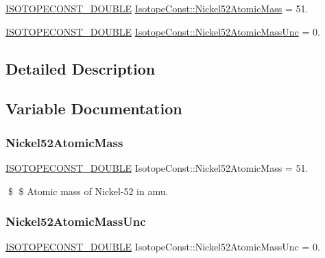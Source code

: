 \begin{DoxyCompactItemize}
\item 
\mbox{\hyperlink{group___isotope_const-_macros_ga8f45a7272ce02c0b4c65c44636ed719a}{I\+S\+O\+T\+O\+P\+E\+C\+O\+N\+S\+T\+\_\+\+D\+O\+U\+B\+LE}} \mbox{\hyperlink{group___isotope_const-_nickel-_ni52_ga25692217d321bda15555c4bd782d0579}{Isotope\+Const\+::\+Nickel52\+Atomic\+Mass}} = 51.
\item 
\mbox{\hyperlink{group___isotope_const-_macros_ga8f45a7272ce02c0b4c65c44636ed719a}{I\+S\+O\+T\+O\+P\+E\+C\+O\+N\+S\+T\+\_\+\+D\+O\+U\+B\+LE}} \mbox{\hyperlink{group___isotope_const-_nickel-_ni52_ga3ffdc1ebd3eae89ee06c9985dcb5be0f}{Isotope\+Const\+::\+Nickel52\+Atomic\+Mass\+Unc}} = 0.
\end{DoxyCompactItemize}


\subsection{Detailed Description}


\subsection{Variable Documentation}
\mbox{\label{group___isotope_const-_nickel-_ni52_ga25692217d321bda15555c4bd782d0579}} 
\subsubsection{\texorpdfstring{Nickel52\+Atomic\+Mass}{Nickel52AtomicMass}}
{\footnotesize\ttfamily \mbox{\hyperlink{group___isotope_const-_macros_ga8f45a7272ce02c0b4c65c44636ed719a}{I\+S\+O\+T\+O\+P\+E\+C\+O\+N\+S\+T\+\_\+\+D\+O\+U\+B\+LE}} Isotope\+Const\+::\+Nickel52\+Atomic\+Mass = 51.}

\$ \$ Atomic mass of Nickel-\/52 in amu. \mbox{\label{group___isotope_const-_nickel-_ni52_ga3ffdc1ebd3eae89ee06c9985dcb5be0f}} 
\subsubsection{\texorpdfstring{Nickel52\+Atomic\+Mass\+Unc}{Nickel52AtomicMassUnc}}
{\footnotesize\ttfamily \mbox{\hyperlink{group___isotope_const-_macros_ga8f45a7272ce02c0b4c65c44636ed719a}{I\+S\+O\+T\+O\+P\+E\+C\+O\+N\+S\+T\+\_\+\+D\+O\+U\+B\+LE}} Isotope\+Const\+::\+Nickel52\+Atomic\+Mass\+Unc = 0.}

